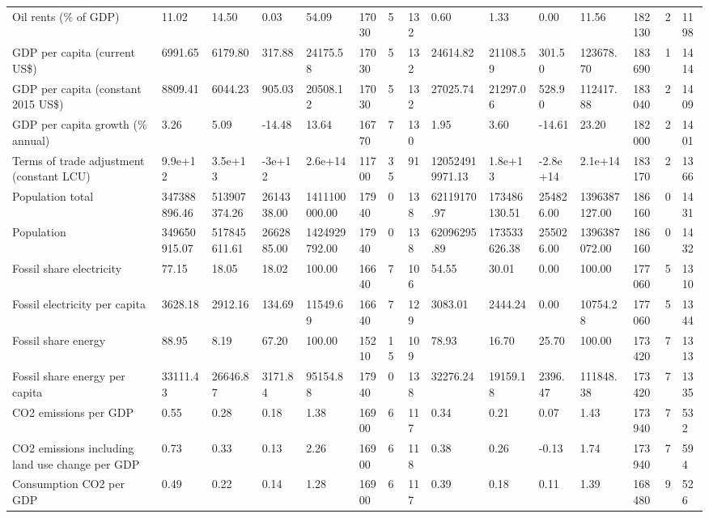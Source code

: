 \begin{longtable}{lllllllllllllll}
Oil rents (\% of GDP) & 11.02 & 14.50 & 0.03 & 54.09 & 17030 & 5 & 132 & 0.60 & 1.33 & 0.00 & 11.56 & 182130 & 2 & 1198\\
GDP per capita (current US\$) & 6991.65 & 6179.80 & 317.88 & 24175.58 & 17030 & 5 & 132 & 24614.82 & 21108.59 & 301.50 & 123678.70 & 183690 & 1 & 1414\\
GDP per capita (constant 2015 US\$) & 8809.41 & 6044.23 & 905.03 & 20508.12 & 17030 & 5 & 132 & 27025.74 & 21297.06 & 528.90 & 112417.88 & 183040 & 2 & 1409\\
\addlinespace
GDP per capita growth (\% annual) & 3.26 & 5.09 & -14.48 & 13.64 & 16770 & 7 & 130 & 1.95 & 3.60 & -14.61 & 23.20 & 182000 & 2 & 1401\\
Terms of trade adjustment (constant LCU) & 9.9e+12 & 3.5e+13 & -3e+12 & 2.6e+14 & 11700 & 35 & 91 & 120524919971.13 & 1.8e+13 & -2.8e+14 & 2.1e+14 & 183170 & 2 & 1366\\
Population total & 347388896.46 & 513907374.26 & 2614338.00 & 1411100000.00 & 17940 & 0 & 138 & 62119170.97 & 173486130.51 & 254826.00 & 1396387127.00 & 186160 & 0 & 1431\\
Population & 349650915.07 & 517845611.61 & 2662885.00 & 1424929792.00 & 17940 & 0 & 138 & 62096295.89 & 173533626.38 & 255026.00 & 1396387072.00 & 186160 & 0 & 1432\\
Fossil share electricity & 77.15 & 18.05 & 18.02 & 100.00 & 16640 & 7 & 106 & 54.55 & 30.01 & 0.00 & 100.00 & 177060 & 5 & 1310\\
\addlinespace
Fossil electricity per capita & 3628.18 & 2912.16 & 134.69 & 11549.69 & 16640 & 7 & 129 & 3083.01 & 2444.24 & 0.00 & 10754.28 & 177060 & 5 & 1344\\
Fossil share energy & 88.95 & 8.19 & 67.20 & 100.00 & 15210 & 15 & 109 & 78.93 & 16.70 & 25.70 & 100.00 & 173420 & 7 & 1313\\
Fossil share energy per capita & 33111.43 & 26646.87 & 3171.84 & 95154.88 & 17940 & 0 & 138 & 32276.24 & 19159.18 & 2396.47 & 111848.38 & 173420 & 7 & 1335\\
CO2 emissions per GDP & 0.55 & 0.28 & 0.18 & 1.38 & 16900 & 6 & 117 & 0.34 & 0.21 & 0.07 & 1.43 & 173940 & 7 & 532\\
CO2 emissions including land use change per GDP & 0.73 & 0.33 & 0.13 & 2.26 & 16900 & 6 & 118 & 0.38 & 0.26 & -0.13 & 1.74 & 173940 & 7 & 594\\
\addlinespace
Consumption CO2 per GDP & 0.49 & 0.22 & 0.14 & 1.28 & 16900 & 6 & 117 & 0.39 & 0.18 & 0.11 & 1.39 & 168480 & 9 & 526\\

\end{longtable}
